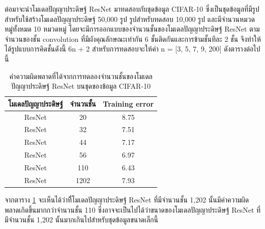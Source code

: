 ต่อมาจะนำโมเดลปัญญาประดิษฐ์ ResNet มาทดสอบกับชุดข้อมูล CIFAR-10 ซึ่งเป็นชุดข้อมูลที่มีรูปสำหรับใช้สร้างโมเดลปัญญาประดิษฐ์ 50,000 รูป รูปสำหรับทดสอบ 10,000 รูป 
และมีจำนวนหมวดหมู่ทั้งหมด 10 หมวดหมู่ โดยจะมีการออกแบบของจำนวนชั้นของโมเดลปัญญาประดิษฐ์ ResNet ตามจำนวนของชั้น convolution 
ที่มีผังคุณลักษณะเท่ากัน 6 ชั้นติดกันและการข้ามชั้นทีละ 2 ชั้น จึงทำให้ได้รูปแบบการคิดชั้นดังนี้ 6n + 2 สำหรับการทดสอบจะให้ค่า n = [3, 5, 7, 9, 200] ดังตารางต่อไปนี้

\begin{table}[!ht]
	\centering
	\begin{tabular}{|c|c|c|}
		\hline
		{โมเดลปัญญาประดิษฐ์}		  &{จำนวนชั้น}				    &{Training error}	\\
		\hline
		ResNet						& 20						& 8.75				\\
		ResNet						& 32						& 7.51				\\
		ResNet						& 44						& 7.17				\\
		ResNet						& 56						& 6.97				\\
		ResNet						& 110						& 6.43				\\
		ResNet						& 1202						& 7.93				\\
		\hline
	\end{tabular}
	\caption{ค่าความผิดพลาดที่ได้จากการทดลองจำนวนชั้นของโมเดลปัญญาประดิษฐ์ ResNet บนชุดของข้อมูล CIFAR-10}
	\label{tab: หมวดหมู่ification error}
\end{table}
จากตาราง \ref{tab: หมวดหมู่ification error} จะเห็นได้ว่าที่ีโมเดลปัญญาประดิษฐ์ ResNet ที่มีจำนวนชั้น 1,202 
นั้นมีค่าความผิดพลาดเกิดขึ้นมากกว่าจำนวนชั้น 110 ซึ่งอาจจะเป็นไปได้ว่าขนาดของโมเดลปัญญาประดิษฐ์ ResNet ที่มีจำนวนชั้น 1,202 
นั้นมากเกินไปสำหรับชุดข้อมูลขนาดเล็กนี้